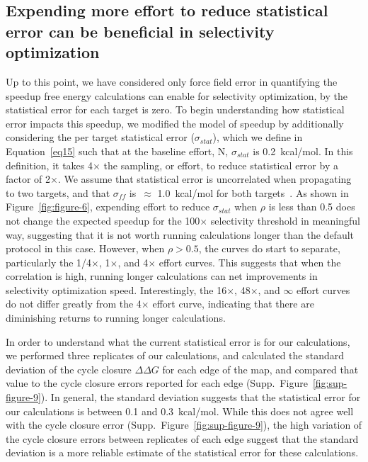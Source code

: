 \documentclass[phd,tocprelim]{cornell}
\begin{document}
\subsection{Expending more effort to reduce statistical error can be beneficial in selectivity optimization}

Up to this point, we have considered only force field error in quantifying the speedup free energy calculations can enable for selectivity optimization, by the statistical error for each target is zero. 
To begin understanding how statistical error impacts this speedup, we modified the model of speedup by additionally considering the per target statistical error ($\sigma_{stat}$), which we define in Equation~\ref{eq15} such that at the baseline effort, N, $\sigma_{stat}$ is 0.2~kcal/mol. In this definition, it takes 4$\times$ the sampling, or effort, to reduce statistical error by a factor of 2$\times$. 
We assume that statistical error is uncorrelated when propagating to two targets, and that $\sigma_{ff}$ is~$\approx$ 1.0~kcal/mol for both targets~\citep{Harder2016-zn, Hauser:2018vz}. As shown in Figure~\ref{fig:figure-6}, expending effort to reduce $\sigma_{stat}$ when $\rho$ is less than 0.5 does not change the expected speedup for the 100$\times$ selectivity threshold in meaningful way, suggesting that it is not worth running calculations longer than the default protocol in this case. However, when $\rho > 0.5$, the curves do start to separate, particularly the 1/4$\times$, 1$\times$, and 4$\times$ effort curves. This suggests that when the correlation is high, running longer calculations can net improvements in selectivity optimization speed. Interestingly, the 16$\times$, 48$\times$, and $\infty$ effort curves do not differ greatly from the 4$\times$ effort curve, indicating that there are diminishing returns to running longer calculations. 

In order to understand what the current statistical error is for our calculations, we performed three replicates of our calculations, and calculated the standard deviation of the cycle closure $\Delta \Delta G$ for each edge of the map, and compared that value to the cycle closure errors reported for each edge (Supp.~Figure~\ref{fig:sup-figure-9}). 
In general, the standard deviation suggests that the statistical error for our calculations is between 0.1 and 0.3~kcal/mol. While this does not agree well with the cycle closure error (Supp.~Figure~\ref{fig:sup-figure-9}), the high variation of the cycle closure errors between replicates of each edge suggest that the standard deviation is a more reliable estimate of the statistical error for these calculations. 
\end{document}

